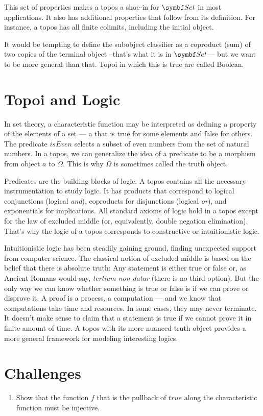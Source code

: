 This set of properties makes a topos a shoe-in for $\Set$ in most
applications. It also has additional properties that follow from its
definition. For instance, a topos has all finite colimits, including the
initial object.

It would be tempting to define the subobject classifier as a coproduct
(sum) of two copies of the terminal object --that's what it is in
$\Set$--- but we want to be more general than that. Topoi in which
this is true are called Boolean.

\section{Topoi and Logic}

In set theory, a characteristic function may be interpreted as defining
a property of the elements of a set --- a  that is true
for some elements and false for others. The predicate $\mathit{isEven}$
selects a subset of even numbers from the set of natural numbers. In a
topos, we can generalize the idea of a predicate to be a morphism from
object $a$ to $\Omega$. This is why $\Omega$ is sometimes
called the truth object.

Predicates are the building blocks of logic. A topos contains all the
necessary instrumentation to study logic. It has products that
correspond to logical conjunctions (logical \emph{and}), coproducts for
disjunctions (logical \emph{or}), and exponentials for implications. All
standard axioms of logic hold in a topos except for the law of excluded
middle (or, equivalently, double negation elimination). That's why the
logic of a topos corresponds to constructive or intuitionistic logic.

Intuitionistic logic has been steadily gaining ground, finding
unexpected support from computer science. The classical notion of
excluded middle is based on the belief that there is absolute truth: Any
statement is either true or false or, as Ancient Romans would say,
\emph{tertium non datur} (there is no third option). But the only way we
can know whether something is true or false is if we can prove or
disprove it. A proof is a process, a computation --- and we know that
computations take time and resources. In some cases, they may never
terminate. It doesn't make sense to claim that a statement is true if we
cannot prove it in finite amount of time. A topos with its more nuanced
truth object provides a more general framework for modeling interesting
logics.

\section{Challenges}

\begin{enumerate}
  \tightlist
  \item
        Show that the function $f$ that is the pullback of
        $\mathit{true}$ along the characteristic function must be injective.
\end{enumerate}
